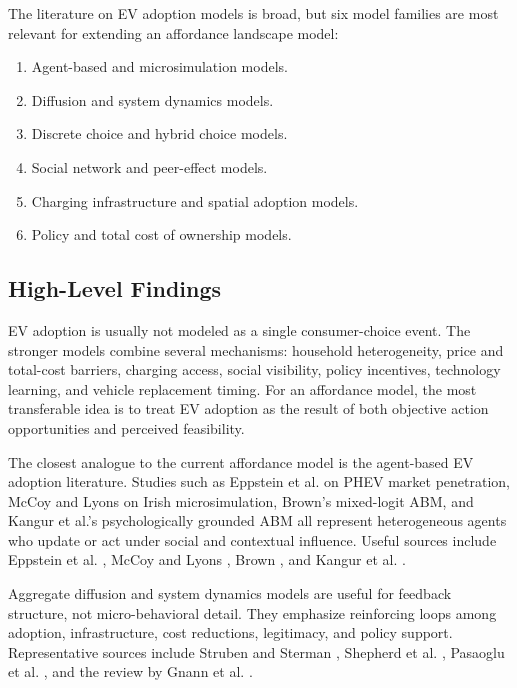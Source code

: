 \documentclass[11pt]{article} %
\begin{document}
The literature on EV adoption models is broad, but six model families are most
relevant for extending an affordance landscape model:

\begin{enumerate}
    \item Agent-based and microsimulation models.
    \item Diffusion and system dynamics models.
    \item Discrete choice and hybrid choice models.
    \item Social network and peer-effect models.
    \item Charging infrastructure and spatial adoption models.
    \item Policy and total cost of ownership models.
\end{enumerate}

\subsection{High-Level Findings}

EV adoption is usually not modeled as a single consumer-choice event. The
stronger models combine several mechanisms: household heterogeneity, price and
total-cost barriers, charging access, social visibility, policy incentives,
technology learning, and vehicle replacement timing. For an affordance model,
the most transferable idea is to treat EV adoption as the result of both
objective action opportunities and perceived feasibility.

The closest analogue to the current affordance model is the agent-based EV
adoption literature. Studies such as Eppstein et al. on PHEV market penetration,
McCoy and Lyons on Irish microsimulation, Brown's mixed-logit ABM, and Kangur et
al.'s psychologically grounded ABM all represent heterogeneous agents who update
or act under social and contextual influence. Useful sources include
Eppstein et al. \cite{eppstein2011}, McCoy and Lyons \cite{mccoy2014},
Brown \cite{brown2013}, and Kangur et al. \cite{kangur2017}.

Aggregate diffusion and system dynamics models are useful for feedback
structure, not micro-behavioral detail. They emphasize reinforcing loops among
adoption, infrastructure, cost reductions, legitimacy, and policy support.
Representative sources include
Struben and Sterman \cite{struben2008}, Shepherd et al. \cite{shepherd2012},
Pasaoglu et al. \cite{pasaoglu2016}, and the review by Gnann et al.
\cite{gnann2018}.
\end{document}
